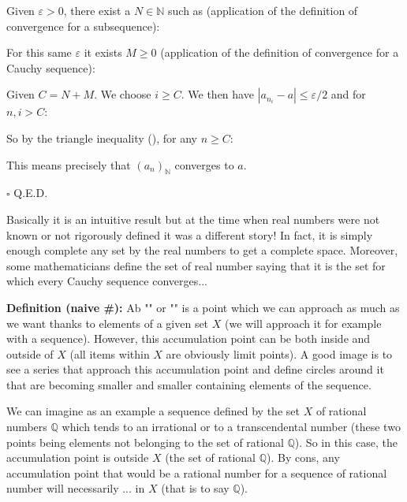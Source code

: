 	\begin{dem}
	Given $\varepsilon>0$, there exist a $N\in \mathbb{N}$ such as (application of the definition of convergence for a subsequence):
	
	For this same $\varepsilon$ it exists $M\geq 0$ (application of the definition of convergence for a Cauchy sequence):
	
	Given $C=N+M$. We choose $i\geq C$. We then have $|a_{n_i}-a|\leq \varepsilon/2$ and for $n,i>C$:
	
	So by the triangle inequality (), for any $n\geq C$:
	
	This means precisely that $(a_n)_\mathbb{N}$ converges to $a$.
	\begin{flushright}
		$\square$  Q.E.D.
	\end{flushright}
	\end{dem}
	Basically it is an intuitive result but at the time when real numbers were not known or not rigorously defined it was a different story! In fact, it is simply enough complete any set by the real numbers to get a complete space. Moreover, some mathematicians define the set of real number saying that it is the set for which every Cauchy sequence converges...
	
	\textbf{Definition (naive \#\mydef):} Ab "" or "" is a point which we can approach as much as we want thanks to elements of a given set $X$ (we will approach it for example with a sequence). However, this accumulation point can be both inside and outside of $X$ (all items within $X$ are obviously limit points). A good image is to see a series that approach this accumulation point and define circles around it that are becoming smaller and smaller containing elements of the sequence.
	
	We can imagine as an example a sequence defined by the set $X$ of rational numbers $\mathbb{Q}$ which tends to an irrational or to a transcendental number (these two points being elements not belonging to the set of rational $\mathbb{Q}$). So in this case, the accumulation point is outside $X$ (the set of rational $\mathbb{Q}$). By cons, any accumulation point that would be a rational number for a sequence of rational number will necessarily ... in $X$ (that is to say $\mathbb{Q}$).
	
